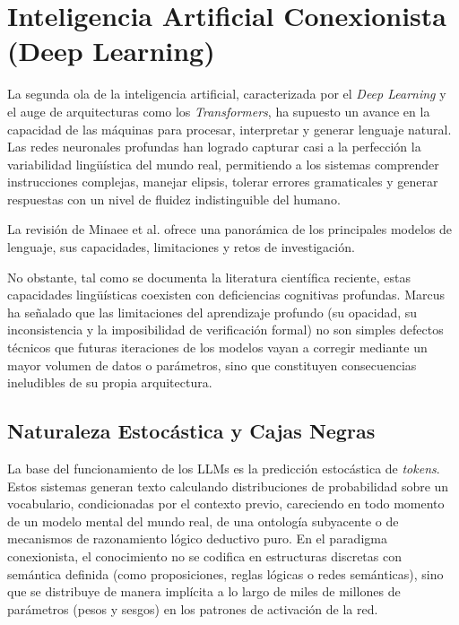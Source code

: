 \documentclass[12pt,a4paper]{report}
\begin{document}
\section{Inteligencia Artificial Conexionista (Deep Learning)}

La segunda ola de la inteligencia artificial, caracterizada por el \textit{Deep Learning} y el auge de arquitecturas como los \textit{Transformers}, ha supuesto un avance en la capacidad de las máquinas para procesar, interpretar y generar lenguaje natural. Las redes neuronales profundas han logrado capturar casi a la perfección la variabilidad lingüística del mundo real, permitiendo a los sistemas comprender instrucciones complejas, manejar elipsis, tolerar errores gramaticales y generar respuestas con un nivel de fluidez indistinguible del humano.

La revisión de Minaee et al. \cite{minaee2024llmsurvey} ofrece una panorámica de los principales modelos de lenguaje, sus capacidades, limitaciones y retos de investigación.

No obstante, tal como se documenta la literatura científica reciente, estas capacidades lingüísticas coexisten con deficiencias cognitivas profundas. Marcus \cite{marcus2020nextdecade} ha señalado que las limitaciones del aprendizaje profundo (su opacidad, su inconsistencia y la imposibilidad de verificación formal) no son simples defectos técnicos que futuras iteraciones de los modelos vayan a corregir mediante un mayor volumen de datos o parámetros, sino que constituyen consecuencias ineludibles de su propia arquitectura.

\subsection{Naturaleza Estocástica y Cajas Negras}

La base del funcionamiento de los LLMs es la predicción estocástica de \textit{tokens}. Estos sistemas generan texto calculando distribuciones de probabilidad sobre un vocabulario, condicionadas por el contexto previo, careciendo en todo momento de un modelo mental del mundo real, de una ontología subyacente o de mecanismos de razonamiento lógico deductivo puro. En el paradigma conexionista, el conocimiento no se codifica en estructuras discretas con semántica definida (como proposiciones, reglas lógicas o redes semánticas), sino que se distribuye de manera implícita a lo largo de miles de millones de parámetros (pesos y sesgos) en los patrones de activación de la red.
\end{document}
